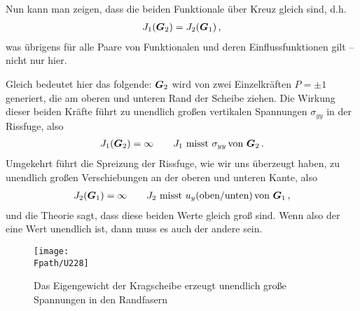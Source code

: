 Nun kann man zeigen, dass die beiden Funktionale \glq \"{u}ber Kreuz\grq{} gleich sind, d.h.
\begin{align}
J_1(\mbox{\boldmath $G$}_2) = J_2(\mbox{\boldmath $G$}_1)\,,
\end{align}
was \"{u}brigens f\"{u}r alle Paare von Funktionalen und deren Einflussfunktionen gilt -- nicht nur hier.

Gleich bedeutet hier das folgende: $\mbox{\boldmath $G$}_2$ wird von zwei Einzelkr\"{a}ften $P = \pm 1$ generiert, die am oberen und unteren Rand der Scheibe ziehen. Die Wirkung dieser beiden Kr\"{a}fte f\"{u}hrt zu unendlich gro{\ss}en vertikalen Spannungen $\sigma_{yy} $ in der Rissfuge, also
\begin{align}
J_1(\mbox{\boldmath $G$}_2) = \infty \qquad J_1\,\,\text{misst $\sigma_{yy}$} \,\text{von $\mbox{\boldmath $G$}_2$}\,.
\end{align}
Umgekehrt f\"{u}hrt die Spreizung der Rissfuge, wie wir uns \"{u}berzeugt haben, zu unendlich gro{\ss}en Verschiebungen an der oberen und unteren Kante, also
\begin{align}
J_2(\mbox{\boldmath $G$}_1) = \infty \qquad J_2\,\,\text{misst $u_y(\text{oben/unten})$} \,\text{von $\mbox{\boldmath $G$}_1$}\,,
\end{align}
und die Theorie sagt, dass diese beiden Werte gleich gro{\ss} sind. Wenn also der eine Wert unendlich ist, dann muss es auch der andere sein.

\begin{figure}
\centering
\texttt{[image: \\Fpath/U228]}
\caption{Das Eigengewicht der Kragscheibe erzeugt unendlich gro{\ss}e Spannungen in den Randfasern}
\label{U228}%
\end{figure}%

